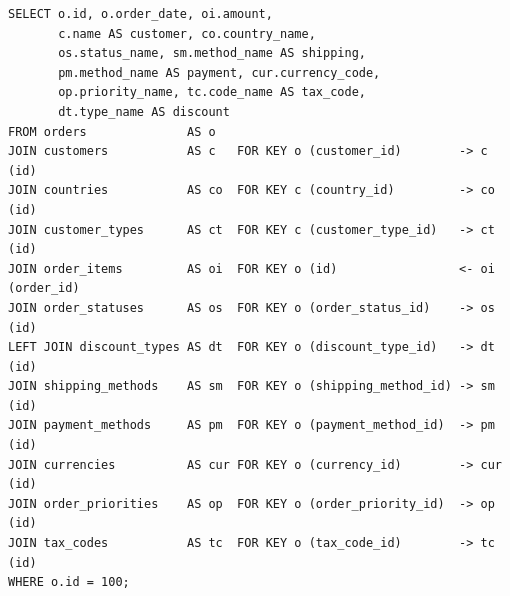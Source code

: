 \documentclass[12pt]{article}
\newcommand{\FanoutCheckHeight}[3]{%
  \ifdim\dimexpr\ht#1+\dp#1\relax>#2\relax
    \PackageError{fanout-layout}{#3 exceeds its vertical allocation}%
      {Adjust the terminal line spacing or the box position.}%
  \fi
}
\begin{document}
\newsavebox{\canonicalStageNine}
\begin{lrbox}{\canonicalStageNine}\begin{minipage}{344mm}
\begin{NoHyper}
\begin{lstlisting}[style=complex-sql]
SELECT o.id, o.order_date, oi.amount,
       c.name AS customer, co.country_name,
       os.status_name, sm.method_name AS shipping,
       pm.method_name AS payment, cur.currency_code,
       op.priority_name, tc.code_name AS tax_code,
       dt.type_name AS discount
FROM orders              AS o
JOIN customers           AS c   FOR KEY o (customer_id)        -> c (id)
JOIN countries           AS co  FOR KEY c (country_id)         -> co (id)
JOIN customer_types      AS ct  FOR KEY c (customer_type_id)   -> ct (id)
JOIN order_items         AS oi  FOR KEY o (id)                 <- oi (order_id)
JOIN order_statuses      AS os  FOR KEY o (order_status_id)    -> os (id)
LEFT JOIN discount_types AS dt  FOR KEY o (discount_type_id)   -> dt (id)
JOIN shipping_methods    AS sm  FOR KEY o (shipping_method_id) -> sm (id)
JOIN payment_methods     AS pm  FOR KEY o (payment_method_id)  -> pm (id)
JOIN currencies          AS cur FOR KEY o (currency_id)        -> cur (id)
JOIN order_priorities    AS op  FOR KEY o (order_priority_id)  -> op (id)
JOIN tax_codes           AS tc  FOR KEY o (tax_code_id)        -> tc (id)
WHERE o.id = 100;
\end{lstlisting}
\end{NoHyper}
\end{minipage}\end{lrbox}
\FanoutCheckHeight{\canonicalStageNine}{122mm}{Canonical-form state 9}
\end{document}
